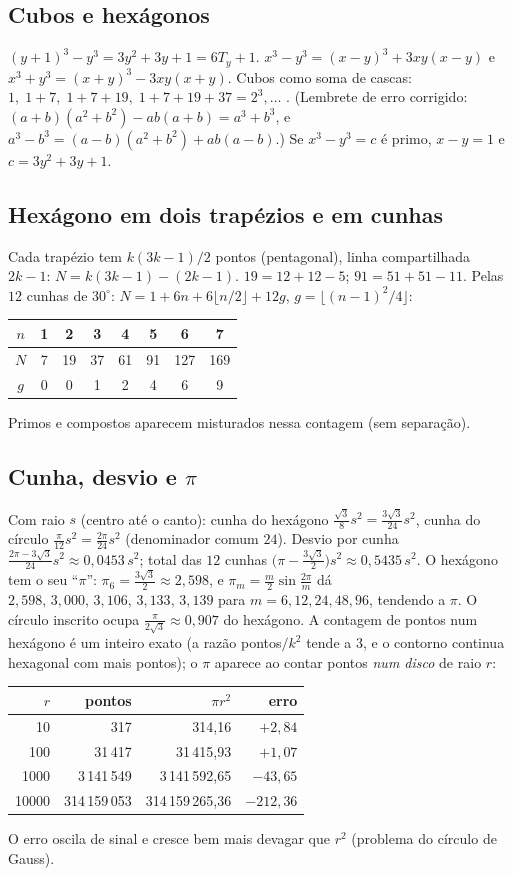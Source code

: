 \documentclass[11pt,a4paper]{article}
\begin{document}
\subsection{Cubos e hexágonos}
$(y+1)^3-y^3=3y^2+3y+1=6T_y+1$. $x^3-y^3=(x-y)^3+3xy(x-y)$ e $x^3+y^3=(x+y)^3-3xy(x+y)$. Cubos como soma de cascas: $1,\;1+7,\;1+7+19,\;1+7+19+37=2^3,\dots$ . (Lembrete de erro corrigido: $(a+b)(a^2+b^2)-ab(a+b)=a^3+b^3$, e $a^3-b^3=(a-b)(a^2+b^2)+ab(a-b)$.) Se $x^3-y^3=c$ é primo, $x-y=1$ e $c=3y^2+3y+1$.

\subsection{Hexágono em dois trapézios e em cunhas}
Cada trapézio tem $k(3k-1)/2$ pontos (pentagonal), linha compartilhada $2k-1$: $N=k(3k-1)-(2k-1)$. $19=12+12-5$; $91=51+51-11$. Pelas $12$ cunhas de $30^\circ$: $N=1+6n+6\lfloor n/2\rfloor+12g$, $g=\lfloor (n-1)^2/4\rfloor$:
\begin{center}
\begin{tabular}{c|ccccccc}
$n$ & 1 & 2 & 3 & 4 & 5 & 6 & 7\\\hline
$N$ & 7 & 19 & 37 & 61 & 91 & 127 & 169\\
$g$ & 0 & 0 & 1 & 2 & 4 & 6 & 9
\end{tabular}
\end{center}
Primos e compostos aparecem misturados nessa contagem (sem separação).

\subsection{Cunha, desvio e $\pi$}
Com raio $s$ (centro até o canto): cunha do hexágono $\tfrac{\sqrt3}{8}s^2=\tfrac{3\sqrt3}{24}s^2$, cunha do círculo $\tfrac{\pi}{12}s^2=\tfrac{2\pi}{24}s^2$ (denominador comum $24$). Desvio por cunha $\tfrac{2\pi-3\sqrt3}{24}s^2\approx0{,}0453\,s^2$; total das $12$ cunhas $\bigl(\pi-\tfrac{3\sqrt3}{2}\bigr)s^2\approx0{,}5435\,s^2$. O hexágono tem o seu ``$\pi$'': $\pi_6=\tfrac{3\sqrt3}{2}\approx2{,}598$, e $\pi_m=\tfrac m2\sin\tfrac{2\pi}{m}$ dá $2{,}598,\,3{,}000,\,3{,}106,\,3{,}133,\,3{,}139$ para $m=6,12,24,48,96$, tendendo a $\pi$. O círculo inscrito ocupa $\tfrac{\pi}{2\sqrt3}\approx0{,}907$ do hexágono. A contagem de pontos num hexágono é um inteiro exato (a razão pontos$/k^2$ tende a $3$, e o contorno continua hexagonal com mais pontos); o $\pi$ aparece ao contar pontos \emph{num disco} de raio $r$:
\begin{center}
\begin{tabular}{rrrr}
\toprule
$r$ & pontos & $\pi r^2$ & erro \\
\midrule
10 & 317 & 314,16 & $+2{,}84$ \\
100 & 31\,417 & 31\,415,93 & $+1{,}07$ \\
1000 & 3\,141\,549 & 3\,141\,592,65 & $-43{,}65$ \\
10000 & 314\,159\,053 & 314\,159\,265,36 & $-212{,}36$ \\
\bottomrule
\end{tabular}
\end{center}
O erro oscila de sinal e cresce bem mais devagar que $r^2$ (problema do círculo de Gauss).
\end{document}
